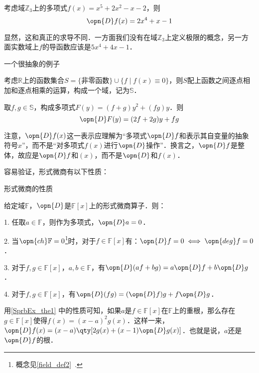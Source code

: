 \begin{example}{}
考虑域$\mathbb{Z}_3$上的多项式$f(x)=x^5+2x^2-x-2$，则
\begin{equation}
\opn{D}f(x) = 2x^4+x-1
\end{equation}

显然，这和真正的求导不同．一方面我们没有在域$\mathbb{Z}_3$上定义极限的概念，另一方面实数域上$f$的导函数应该是$5x^4+4x-1$．
\end{example}

\begin{example}{一个很抽象的例子}

考虑$\mathbb{R}$上的函数集合$S=\{\text{非零函数}\}\cup\{f\mid f(x)\equiv 0\}$，则$S$配上函数之间逐点相加和逐点相乘的运算，构成一个域，记为$\mathbb{S}$．

取$f, g\in\mathbb{S}$，构成多项式$F(y)=(f+g)y^2+(fg)y$．则
\begin{equation}
\opn{D}F(y) = (2f+2g)y+fg
\end{equation}

\end{example}

注意，$\opn{D}f(x)$这一表示应理解为“多项式$\opn{D}f$和表示其自变量的抽象符号$x$”，而不是“对多项式$f(x)$进行$\opn{D}$操作”．换言之，$\opn{D}f$是整体，故应是$\opn{D}f$和$(x)$，而不是$\opn{D}$和$f(x)$．

容易验证，形式微商有以下性质：

\begin{theorem}{形式微商的性质}\label{SprbEx_the1}

给定域$\mathbb{F}$，$\opn{D}$是$\mathbb{F}[x]$上的形式微商算子．则：

1. 任取$a\in\mathbb{F}$，则作为多项式，$\opn{D}a=0$．

2. 当$\opn{ch}\mathbb{F}=0$\footnote{概念见\autoref{field_def2}~. }时，对于$f\in\mathbb{F}[x]$有：$\opn{D}f=0 \iff \opn{deg}f=0$．

3. 对于$f, g\in\mathbb{F}[x]$，$a, b\in\mathbb{F}$，有$\opn{D}(af+bg)=a\opn{D}f+b\opn{D}g$．

4. 对于$f, g\in\mathbb{F}[x]$，有$\opn{D}(fg) = (\opn{D}f)g+f\opn{D}g$．

\end{theorem}

用\autoref{SprbEx_the1} 中的性质可知，如果$a$是$f\in\mathbb{F}[x]$在$\mathbb{F}$上的重根，那么存在$g\in\mathbb{F}[x]$使得$f(x)=(x-a)^2g(x)$．这样一来，$\opn{D}f(x)=(x-a)\qty[2g(x)+(x-1)\opn{D}g(x)]$．也就是说，$a$还是$\opn{D}f$的根．


